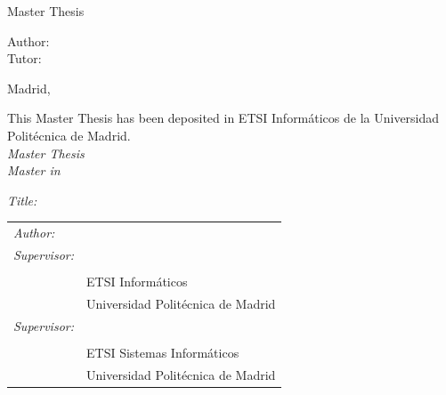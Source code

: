 \begin{titlepage}
\vspace*{1cm}
\begin{center}
\huge{ Master Thesis}
\end{center}

\vspace*{0.5cm}
\begin{center}
\huge\bfseries {  \TituloTFM{} } 
\end{center}

\vspace*{5cm}

\noindent
\large{Author: \NombreAutor{} }\\
\large{Tutor: \NombreTutors{} }


\vspace*{4cm}
\begin{center}
Madrid, \fecha
\end{center}

\newpage
\thispagestyle{empty}
\noindent
This Master Thesis has been deposited in ETSI Informáticos de la Universidad Politécnica de Madrid. \\

\vspace*{4cm}
\noindent
\textit{Master Thesis} \\
\textit{Master in} \Master{}


\textit{Title:} \TituloTFM{} \\
\Date


\vspace*{7cm}

\noindent
\begin{tabular}{ll}
\textit{Author:} & \NombreAutor{}  \\ 
\textit{Supervisor:} & \PrimaryTutorName{}  \\ 
                & \PrimaryTutorDepartment{} \\
                & ETSI Informáticos\\
                & Universidad Politécnica de Madrid \\ 


\textit{Supervisor:} & \ViceTutorName{}  \\ 
                & \ViceTutorDepartment{} \\
                & ETSI Sistemas Informáticos\\
                & Universidad Politécnica de Madrid \\

\end{tabular} 

\end{titlepage}
